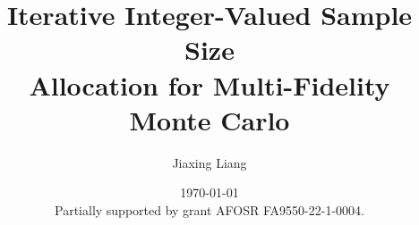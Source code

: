 \documentclass{beamer}
\title[MFMC for Tokamak UQ]{Iterative Integer-Valued Sample Size \\Allocation for Multi-Fidelity Monte Carlo}
\date{\today\\[2em]
{\footnotesize Partially supported by grant AFOSR FA9550-22-1-0004. }
}
\author[J.Liang]{\normalsize  Jiaxing Liang\\ }
\institute[Rice University]{\fontsize{8}{8} Department of Computational Applied Mathematics \& Operations Research, Rice University}
\begin{document}
\frame{\titlepage }

\end{document}

